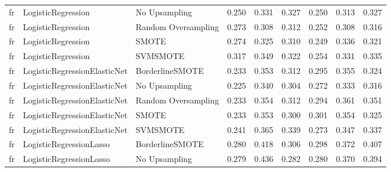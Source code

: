\begin{tabular}{lllllllll}
      fr &           LogisticRegression &       No Upsampling & 0.250 &                     0.331 &                 0.327 &                  0.250 &                                   0.313 &     0.327 \\
      fr &           LogisticRegression & Random Oversampling & 0.273 &                     0.308 &                 0.312 &                  0.252 &                                   0.308 &     0.316 \\
      fr &           LogisticRegression &               SMOTE & 0.274 &                     0.325 &                 0.310 &                  0.249 &                                   0.336 &     0.321 \\
      fr &           LogisticRegression &            SVMSMOTE & 0.317 &                     0.349 &                 0.322 &                  0.254 &                                   0.331 &     0.335 \\
      fr & LogisticRegressionElasticNet &     BorderlineSMOTE & 0.233 &                     0.353 &                 0.312 &                  0.295 &                                   0.355 &     0.324 \\
      fr & LogisticRegressionElasticNet &       No Upsampling & 0.225 &                     0.340 &                 0.304 &                  0.272 &                                   0.333 &     0.316 \\
      fr & LogisticRegressionElasticNet & Random Oversampling & 0.233 &                     0.354 &                 0.312 &                  0.294 &                                   0.361 &     0.351 \\
      fr & LogisticRegressionElasticNet &               SMOTE & 0.233 &                     0.353 &                 0.300 &                  0.301 &                                   0.354 &     0.325 \\
      fr & LogisticRegressionElasticNet &            SVMSMOTE & 0.241 &                     0.365 &                 0.339 &                  0.273 &                                   0.347 &     0.337 \\
      fr &      LogisticRegressionLasso &     BorderlineSMOTE & 0.280 &                     0.418 &                 0.306 &                  0.298 &                                   0.372 &     0.407 \\
      fr &      LogisticRegressionLasso &       No Upsampling & 0.279 &                     0.436 &                 0.282 &                  0.280 &                                   0.370 &     0.394 \\

\end{tabular}
